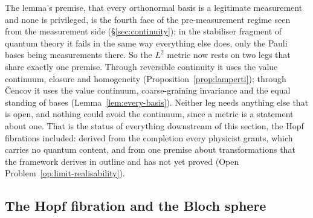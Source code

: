 The lemma's premise, that every orthonormal basis is a legitimate measurement and none is
privileged, is the fourth face of the pre-measurement regime seen from the measurement side
(\S\ref{sec:continuity}); in the stabiliser fragment of quantum theory it fails in the same way
everything else does, only the Pauli bases being measurements there. So the $L^{2}$ metric now
rests on two legs that share exactly one premise. Through reversible continuity it uses the
value continuum, closure and homogeneity (Proposition~\ref{prop:lamperti}); through \v{C}encov
it uses the value continuum, coarse-graining invariance and the equal standing of bases
(Lemma~\ref{lem:every-basis}). Neither leg needs anything else that is open, and nothing could
avoid the continuum, since a metric is a statement about one. That is the status of everything
downstream of this section, the Hopf fibrations included: derived from the completion every physicist grants, which carries no quantum content, and from
one premise about transformations that the framework derives in outline and has not yet proved
(Open Problem~\ref{op:limit-realisability}).

\subsection{The Hopf fibration and the Bloch sphere}
\label{sec:hopf-bloch}

